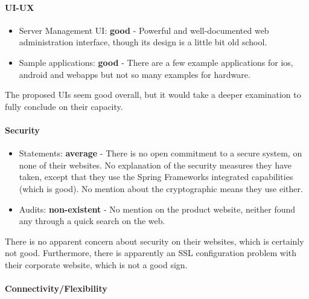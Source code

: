 \documentclass{article}
\begin{document}
\paragraph{UI-UX}

\begin{itemize}
\item Server Management UI: \textbf{good} - Powerful and well-documented web administration interface, though its design is a little bit old school.
\item Sample applications: \textbf{good} - There are a few example applications for ios, android and webapps but not so many examples for hardware.
\end{itemize}

The proposed UIs seem good overall, but it would take a deeper examination to fully conclude on their capacity.

\paragraph{Security} 

\begin{itemize}
\item Statements: \textbf{average} - There is no open commitment to a secure system, on none of their websites. No explanation of the security measures they have taken, except that they use the Spring Frameworks integrated capabilities (which is good). No mention about the cryptographic means they use either.
\item Audits: \textbf{non-existent} - No mention on the product website, neither found any through a quick search on the web.
\end{itemize}

There is no apparent concern about security on their websites, which is certainly not good. Furthermore, there is apparently an SSL configuration problem with their corporate website, which is not a good sign.

\paragraph{Connectivity/Flexibility}
\end{document}
